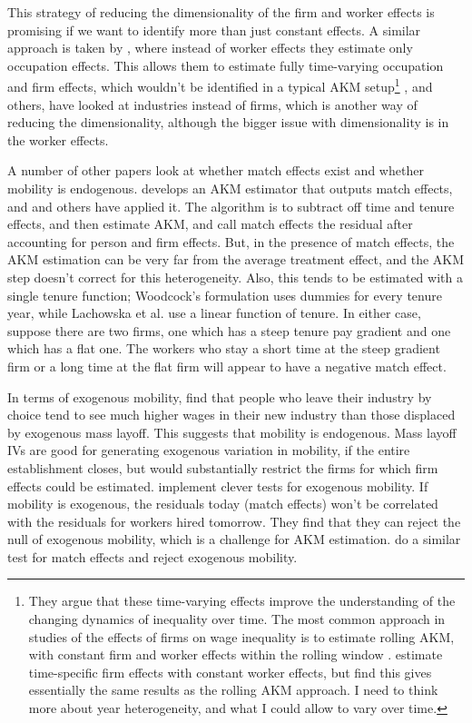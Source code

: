 \documentclass{article}
\begin{document}
This strategy of reducing the dimensionality of the firm and worker effects is promising if we want to identify more than just constant effects. A similar approach is taken by \citet{wilmers2021consolidated}, where instead of worker effects they estimate only occupation effects. This allows them to estimate fully time-varying occupation and firm effects, which wouldn't be identified in a typical AKM setup\footnote{They argue that these time-varying effects improve the understanding of the changing dynamics of inequality over time. The most common approach in studies of the effects of firms on wage inequality is to estimate rolling AKM, with constant firm and worker effects within the rolling window \citep{card2013workplace}. \citet{lachowska2020firm} estimate time-specific firm effects with constant worker effects, but find this gives essentially the same results as the rolling AKM approach. I need to think more about year heterogeneity, and what I could allow to vary over time.} \citet{abowd2012persistent}, and others, have looked at industries instead of firms, which is another way of reducing the dimensionality, although the bigger issue with dimensionality is in the worker effects.

A number of other papers look at whether match effects exist and whether mobility is endogenous. \citet{woodcock2015match} develops an AKM estimator that outputs match effects, and \citet{lachowska2020sources} and others have applied it. The algorithm is to subtract off time and tenure effects, and then estimate AKM, and call match effects the residual after accounting for person and firm effects. But, in the presence of match effects, the AKM estimation can be very far from the average treatment effect, and the AKM step doesn't correct for this heterogeneity. Also, this tends to be estimated with a single tenure function; Woodcock's formulation uses dummies for every tenure year, while Lachowska et al. use a linear function of tenure. In either case, suppose there are two firms, one which has a steep tenure pay gradient and one which has a flat one. The workers who stay a short time at the steep gradient firm or a long time at the flat firm will appear to have a negative match effect.

In terms of exogenous mobility, \citet{gibbons1992does} find that people who leave their industry by choice tend to see much higher wages in their new industry than those displaced by exogenous mass layoff. This suggests that mobility is endogenous. Mass layoff IVs are good for generating exogenous variation in mobility, if the entire establishment closes, but would substantially restrict the firms for which firm effects could be estimated. \citet{abowd2019modeling} implement clever tests for exogenous mobility. If mobility is exogenous, the residuals today (match effects) won't be correlated with the residuals for workers hired tomorrow. They find that they can reject the null of exogenous mobility, which is a challenge for AKM estimation. \citet{bassier2022monopsony} do a similar test for match effects and reject exogenous mobility.
\end{document}
